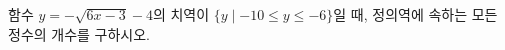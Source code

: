 \hspace*{2mm}\begin{minipage}[t]{\dimexpr\linewidth-2mm\relax}\vspace{0pt}
함수 $y=-\sqrt{6x-3}-4$의 치역이 $\{y \mid -10\le y\le -6\}$일 때, 정의역에 속하는 모든 정수의 개수를 구하시오.\end{minipage}
